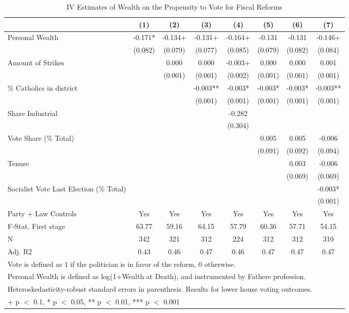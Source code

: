 \begin{table}

\caption{\label{tab:ivresults}IV Estimates of Wealth on the Propensity to Vote for Fiscal Reforms}
\centering
\begin{tabular}[t]{lccccccc}
\toprule
  & (1) & (2) & (3) & (4) & (5) & (6) & (7)\\
\midrule
Personal Wealth & -0.171* & -0.134+ & -0.131+ & -0.164+ & -0.131 & -0.131 & -0.146+\\
 & (0.082) & (0.079) & (0.077) & (0.085) & (0.079) & (0.082) & (0.084)\\
Amount of Strikes &  & 0.000 & 0.000 & -0.003+ & 0.000 & 0.000 & 0.001\\
 &  & (0.001) & (0.001) & (0.002) & (0.001) & (0.001) & (0.001)\\
\% Catholics in district &  &  & -0.003** & -0.003* & -0.003* & -0.003* & -0.003**\\
 &  &  & (0.001) & (0.001) & (0.001) & (0.001) & (0.001)\\
Share Industrial &  &  &  & -0.282 &  &  & \\
 &  &  &  & (0.304) &  &  & \\
Vote Share (\% Total) &  &  &  &  & 0.005 & 0.005 & -0.006\\
 &  &  &  &  & (0.091) & (0.092) & (0.094)\\
Tenure &  &  &  &  &  & 0.003 & -0.006\\
 &  &  &  &  &  & (0.069) & (0.069)\\
Socialist Vote Last Election (\% Total) &  &  &  &  &  &  & -0.003*\\
 &  &  &  &  &  &  & (0.001)\\
\midrule
Party + Law Controls & Yes & Yes & Yes & Yes & Yes & Yes & Yes\\
F-Stat. First stage & 63.77 & 59.16 & 64.15 & 57.79 & 60.36 & 57.71 & 54.15\\
N & 342 & 321 & 312 & 224 & 312 & 312 & 310\\
Adj. R2 & 0.43 & 0.46 & 0.47 & 0.46 & 0.47 & 0.47 & 0.47\\
\bottomrule
\multicolumn{8}{l}{\rule{0pt}{1em}Vote is defined as 1 if the politician is in favor of the reform, 0 otherwise.}\\
\multicolumn{8}{l}{\rule{0pt}{1em}Personal Wealth is defined as log(1+Wealth at Death), and instrumented by Fathers profession.}\\
\multicolumn{8}{l}{\rule{0pt}{1em}Heteroskedasticity-robust standard errors in parenthesis. Results for lower house voting outcomes.}\\
\multicolumn{8}{l}{\rule{0pt}{1em}+ p $<$ 0.1, * p $<$ 0.05, ** p $<$ 0.01, *** p $<$ 0.001}\\
\end{tabular}
\end{table}
